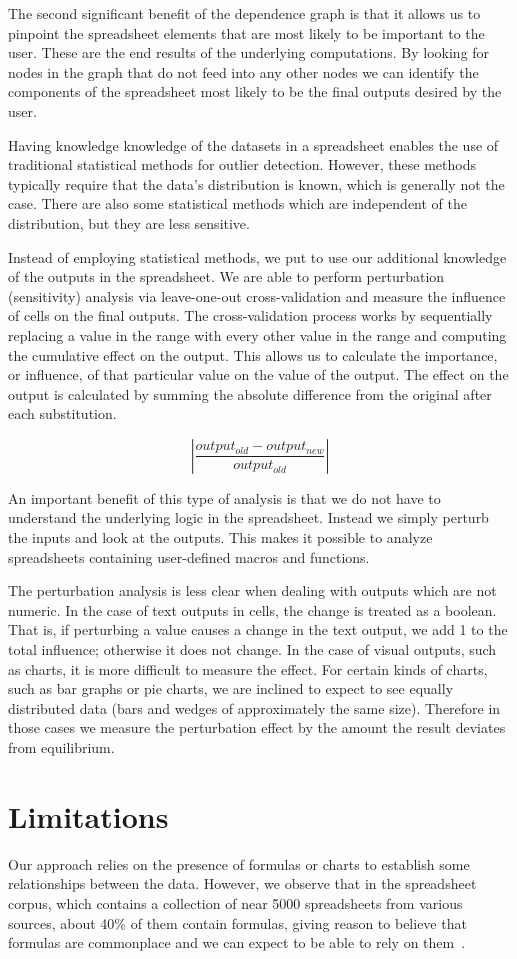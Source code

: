 The second significant benefit of the dependence graph is that it allows
us to pinpoint the spreadsheet elements that are most likely to be
important to the user.  These are the end results of the underlying
computations.  By looking for nodes in the graph that do not feed into
any other nodes we can identify the components of the spreadsheet most
likely to be the final outputs desired by the user.

Having knowledge knowledge of the datasets in a spreadsheet enables
the use of traditional statistical methods for outlier detection.
However, these methods typically require that the data's
distribution is known, which is generally not the case.  There are
also some statistical methods which are independent of the
distribution, but they are less sensitive.

Instead of employing statistical methods, we put to use our additional
knowledge of the outputs in the spreadsheet.  We are able to perform
perturbation (sensitivity) analysis via leave-one-out cross-validation
and measure the influence of cells on the final outputs.  The
cross-validation process works by sequentially replacing a value in
the range with every other value in the range and computing the
cumulative effect on the output.  This allows us to calculate the
importance, or influence, of that particular value on the value of the
output.  The effect on the output is calculated by summing the
absolute difference from the original after each substitution.

\[
\left| \frac{output_{old} - output_{new}}{output_{old}} \right|
\]

An important benefit of this type of analysis is that we do not have
to understand the underlying logic in the spreadsheet.  Instead we
simply perturb the inputs and look at the outputs.  This makes it
possible to analyze spreadsheets containing user-defined macros and
functions.

The perturbation analysis is less clear when dealing with outputs
which are not numeric.  In the case of text outputs in cells, the
change is treated as a boolean.  That is, if perturbing a value causes
a change in the text output, we add 1 to the total influence;
otherwise it does not change.  In the case of visual outputs, such as
charts, it is more difficult to measure the effect.  For certain kinds
of charts, such as bar graphs or pie charts, we are inclined to expect
to see equally distributed data (bars and wedges of approximately the
same size). Therefore in those cases we measure the perturbation
effect by the amount the result deviates from equilibrium.

\section{Limitations}

Our approach relies on the presence of formulas or charts to establish
some relationships between the data.  However, we observe that in the
spreadsheet corpus, which contains a collection of near 5000
spreadsheets from various sources, about 40\% of them contain
formulas, giving reason to believe that formulas are commonplace and
we can expect to be able to rely on them~\cite{Fisher:2005:ESC:1082983.1083242}.
